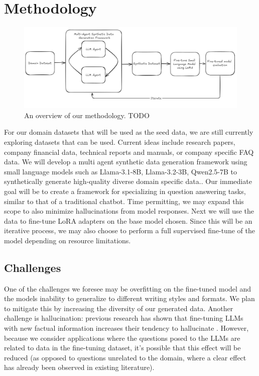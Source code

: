 \section{Methodology}

\begin{figure}[h]
  \centering
  \includegraphics[width=1\textwidth]{methodology.jpg}
  \caption{An overview of our methodology. TODO}
\end{figure}

For our domain datasets that will be used as the seed data, we are still currently exploring datasets that can be used. Current ideas include research papers, company financial data, technical reports and manuals, or company specific FAQ data.
We will develop a multi agent synthetic data generation framework using small language models such as Llama-3.1-8B, Llama-3.2-3B, Qwen2.5-7B to synthetically generate high-quality diverse domain specific data.. Our immediate goal will be to create a framework for specializing in question answering tasks, similar to that of a traditional chatbot. Time permitting, we may expand this scope to also minimize hallucinations from model responses.
Next we will use the data to fine-tune LoRA adapters on the base model chosen. Since this will be an iterative process, we may also choose to perform a full supervised fine-tune of the model depending on resource limitations.

\subsection{Challenges}

One of the challenges we foresee may be overfitting on the fine-tuned model and
the models inability to generalize to different writing styles and formats. We
plan to mitigate this by increasing the diversity of our generated data. Another
challenge is hallucination: previous research has shown that fine-tuning LLMs
with new factual information increases their tendency to hallucinate
\citep{gekhman_does_2024}. However, because we consider applications where the
questions posed to the LLMs are related to data in the fine-tuning dataset, it's
possible that this effect will be reduced (as opposed to questions unrelated to
the domain, where a clear effect has already been observed in existing
literature).
